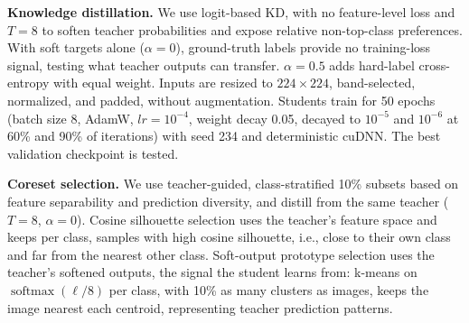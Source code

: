 \documentclass[conference]{IEEEtran}
\begin{document}
\textbf{Knowledge distillation.} We use logit-based KD, with no feature-level loss and $T=8$ to soften teacher probabilities and expose relative non-top-class preferences.
With soft targets alone ($\alpha=0$), ground-truth labels provide no training-loss signal, testing what teacher outputs can transfer. $\alpha=0.5$ adds hard-label cross-entropy with equal weight.
Inputs are resized to $224\times224$, band-selected, normalized, and padded, without augmentation.
Students train for 50 epochs (batch size 8, AdamW, $lr=10^{-4}$, weight decay 0.05, decayed to $10^{-5}$ and $10^{-6}$ at 60\% and 90\% of iterations) with seed 234 and deterministic cuDNN. The best validation checkpoint is tested.

\textbf{Coreset selection.} We use teacher-guided, class-stratified 10\% subsets based on feature separability and prediction diversity, and distill from the same teacher ($T=8$, $\alpha=0$).
Cosine silhouette selection uses the teacher's feature space and keeps per class, samples with high cosine silhouette, i.e., close to their own class and far from the nearest other class.
Soft-output prototype selection uses the teacher's softened outputs, the signal the student learns from: k-means on $\operatorname{softmax}(\ell/8)$ per class, with 10\% as many clusters as images, keeps the image nearest each centroid, representing teacher prediction patterns.




\end{document}
